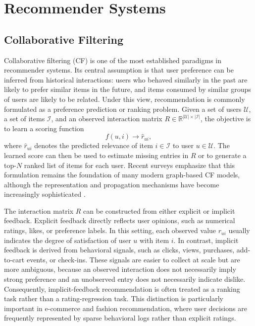 \section{Recommender Systems}

\subsection{Collaborative Filtering}

Collaborative filtering (CF) is one of the most established paradigms in recommender systems. Its central assumption is that user preference can be inferred from historical interactions: users who behaved similarly in the past are likely to prefer similar items in the future, and items consumed by similar groups of users are likely to be related. Under this view, recommendation is commonly formulated as a preference prediction or ranking problem. Given a set of users \(\mathcal{U}\), a set of items \(\mathcal{I}\), and an observed interaction matrix \(R \in \mathbb{R}^{|\mathcal{U}| \times |\mathcal{I}|}\), the objective is to learn a scoring function
\begin{equation}
    f(u,i) \rightarrow \hat{r}_{ui},
\end{equation}
where \(\hat{r}_{ui}\) denotes the predicted relevance of item \(i \in \mathcal{I}\) to user \(u \in \mathcal{U}\). The learned score can then be used to estimate missing entries in \(R\) or to generate a top-\(N\) ranked list of items for each user. Recent surveys emphasize that this formulation remains the foundation of many modern graph-based CF models, although the representation and propagation mechanisms have become increasingly sophisticated \parencite{11359174}.

The interaction matrix \(R\) can be constructed from either explicit or implicit feedback. Explicit feedback directly reflects user opinions, such as numerical ratings, likes, or preference labels. In this setting, each observed value \(r_{ui}\) usually indicates the degree of satisfaction of user \(u\) with item \(i\). In contrast, implicit feedback is derived from behavioral signals, such as clicks, views, purchases, add-to-cart events, or check-ins. These signals are easier to collect at scale but are more ambiguous, because an observed interaction does not necessarily imply strong preference and an unobserved entry does not necessarily indicate dislike. Consequently, implicit-feedback recommendation is often treated as a ranking task rather than a rating-regression task. This distinction is particularly important in e-commerce and fashion recommendation, where user decisions are frequently represented by sparse behavioral logs rather than explicit ratings.

